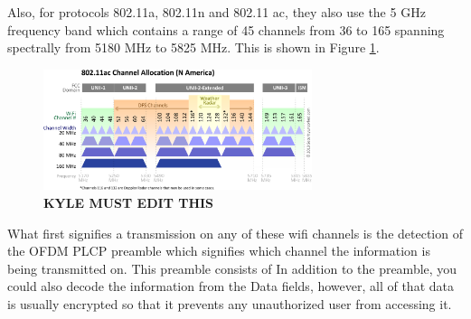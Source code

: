 Also, for protocols 802.11a, 802.11n and 802.11 ac, they also use the 5 GHz frequency band which contains a range of 45 channels from 36 to 165 spanning spectrally from 5180 MHz to 5825 MHz.  This is shown in Figure \ref{fig:5GHz_channel}.
\begin{figure}[ht]
\centering
\includegraphics[width=0.70\textwidth]{img/5_GHz_Channels.png}
\caption{\textbf{KYLE MUST EDIT THIS}}
\label{fig:5GHz_channel}
\end{figure}
What first signifies a transmission on any of these wifi channels is the detection of the OFDM PLCP preamble which signifies which channel the information is being transmitted on. This preamble consists of  In addition to the preamble, you could also decode the information from the Data fields, however, all of that data is usually encrypted so that it prevents any unauthorized user from accessing it. \cite{wifi_book}

